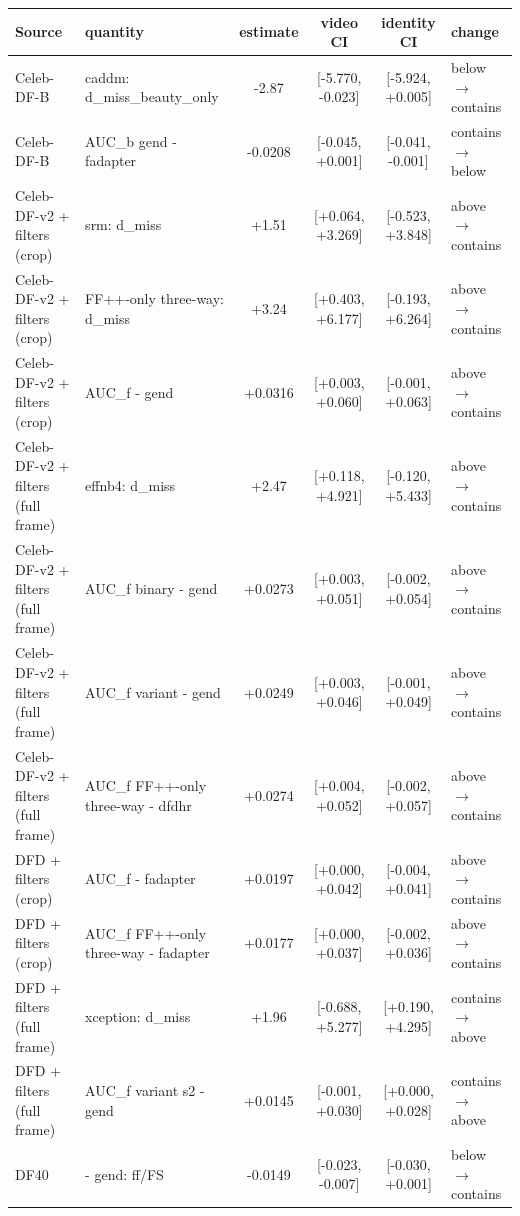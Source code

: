 \begin{tabular}{@{}l l c c c l@{}}
\toprule
Source & quantity & estimate & video CI & identity CI & change \\
\midrule
Celeb-DF-B & caddm: d\_miss\_beauty\_only & -2.87 & [-5.770, -0.023] & [-5.924, +0.005] & below $\rightarrow$ contains \\
Celeb-DF-B & AUC\_b gend - fadapter & -0.0208 & [-0.045, +0.001] & [-0.041, -0.001] & contains $\rightarrow$ below \\
Celeb-DF-v2 + filters (crop) & srm: d\_miss & +1.51 & [+0.064, +3.269] & [-0.523, +3.848] & above $\rightarrow$ contains \\
Celeb-DF-v2 + filters (crop) & FF++-only three-way: d\_miss & +3.24 & [+0.403, +6.177] & [-0.193, +6.264] & above $\rightarrow$ contains \\
Celeb-DF-v2 + filters (crop) & AUC\_f \ours{} - gend & +0.0316 & [+0.003, +0.060] & [-0.001, +0.063] & above $\rightarrow$ contains \\
Celeb-DF-v2 + filters (full frame) & effnb4: d\_miss & +2.47 & [+0.118, +4.921] & [-0.120, +5.433] & above $\rightarrow$ contains \\
Celeb-DF-v2 + filters (full frame) & AUC\_f binary - gend & +0.0273 & [+0.003, +0.051] & [-0.002, +0.054] & above $\rightarrow$ contains \\
Celeb-DF-v2 + filters (full frame) & AUC\_f variant - gend & +0.0249 & [+0.003, +0.046] & [-0.001, +0.049] & above $\rightarrow$ contains \\
Celeb-DF-v2 + filters (full frame) & AUC\_f FF++-only three-way - dfdhr & +0.0274 & [+0.004, +0.052] & [-0.002, +0.057] & above $\rightarrow$ contains \\
DFD + filters (crop) & AUC\_f \ours{} - fadapter & +0.0197 & [+0.000, +0.042] & [-0.004, +0.041] & above $\rightarrow$ contains \\
DFD + filters (crop) & AUC\_f FF++-only three-way - fadapter & +0.0177 & [+0.000, +0.037] & [-0.002, +0.036] & above $\rightarrow$ contains \\
DFD + filters (full frame) & xception: d\_miss & +1.96 & [-0.688, +5.277] & [+0.190, +4.295] & contains $\rightarrow$ above \\
DFD + filters (full frame) & AUC\_f variant s2 - gend & +0.0145 & [-0.001, +0.030] & [+0.000, +0.028] & contains $\rightarrow$ above \\
DF40 & \ours{} - gend: ff/FS & -0.0149 & [-0.023, -0.007] & [-0.030, +0.001] & below $\rightarrow$ contains \\

\end{tabular}
